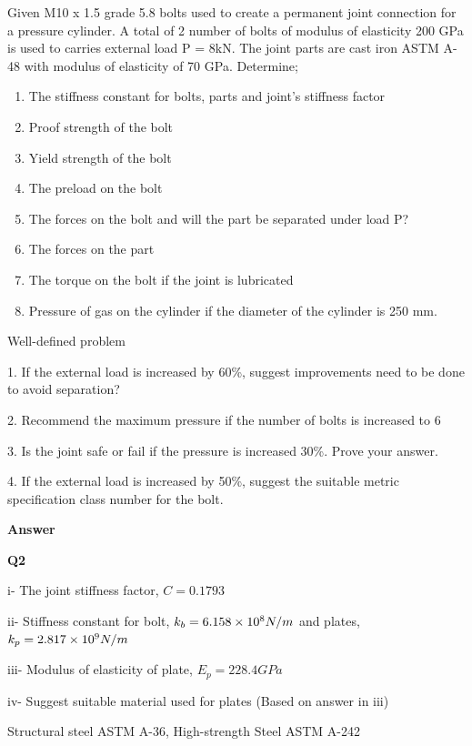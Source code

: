 \documentclass[a4paper, fleqn]{article}
\providecommand{\sci}[1]{\protect\ensuremath{\times 10^{\StrSubstitute[0]{#1}{e}{}}}}
\begin{document}
Given M10 x 1.5 grade 5.8 bolts used to create a permanent joint connection for a pressure cylinder. A total of 2 number of bolts of modulus of elasticity 200 GPa is used to carries external load P = 8kN. The joint parts are cast iron ASTM A-48 with modulus of elasticity of 70 GPa. Determine;

\begin{enumerate}[label=(\roman*)]
    \item The stiffness constant for bolts, parts and joint’s stiffness factor
    \item Proof strength of the bolt
    \item Yield strength of the bolt
    \item The preload on the bolt
    \item The forces on the bolt and will the part be separated under load P?
    \item The forces on the part
    \item The torque on the bolt if the joint is lubricated
    \item Pressure of gas on the cylinder if the diameter of the cylinder is 250 mm.

\end{enumerate}

Well-defined problem

1. If the external load is increased by 60\%, suggest improvements need to be done to avoid separation?

2. Recommend the maximum pressure if the number of bolts is increased to 6

3. Is the joint safe or fail if the pressure is increased 30\%. Prove your answer.

4. If the external load is increased by 50\%, suggest the suitable metric specification class number for the bolt.


\newpage

\textbf{Answer}
\vspace{10pt}

\textbf{Q2}

i- The joint stiffness factor, $C=0.1793$

ii- Stiffness constant for bolt, $k_b=6.158\sci{e8}N/m$ and plates, $k_p=2.817\sci{e9}N/m$

iii- Modulus of elasticity of plate, $E_p=228.4GPa$

iv- Suggest suitable material used for plates (Based on answer in iii)

Structural steel ASTM A-36, High-strength Steel ASTM A-242
\end{document}
